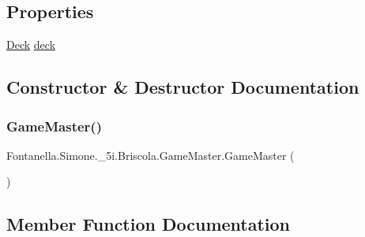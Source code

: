 \subsection*{Properties}
\begin{DoxyCompactItemize}
\item 
\hyperlink{class_fontanella_1_1_simone_1_1__5i_1_1_briscola_1_1_deck}{Deck} \hyperlink{class_fontanella_1_1_simone_1_1__5i_1_1_briscola_1_1_game_master_a20b2b972a62fd9a96cc40c1540732550}{deck}
\end{DoxyCompactItemize}


\subsection{Constructor \& Destructor Documentation}
\hypertarget{class_fontanella_1_1_simone_1_1__5i_1_1_briscola_1_1_game_master_a8ccf5663cf434aba91fb49c93ad1971e}{}\label{class_fontanella_1_1_simone_1_1__5i_1_1_briscola_1_1_game_master_a8ccf5663cf434aba91fb49c93ad1971e} 
\subsubsection{\texorpdfstring{Game\+Master()}{GameMaster()}}
{\footnotesize\ttfamily Fontanella.\+Simone.\+\_\+5i.\+Briscola.\+Game\+Master.\+Game\+Master (\begin{DoxyParamCaption}{ }\end{DoxyParamCaption})}



\subsection{Member Function Documentation}
\hypertarget{class_fontanella_1_1_simone_1_1__5i_1_1_briscola_1_1_game_master_a0daac357a7038fb2229cd916050ff1de}{}\label{class_fontanella_1_1_simone_1_1__5i_1_1_briscola_1_1_game_master_a0daac357a7038fb2229cd916050ff1de} 
